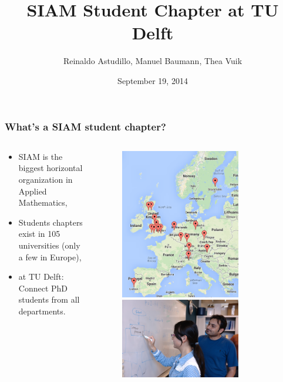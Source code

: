 \documentclass{beamer}
\title{\huge{SIAM Student Chapter at TU Delft}}
\author{Reinaldo Astudillo, Manuel Baumann, Thea Vuik}
\date{\footnotesize{September 19, 2014}}
\begin{document}
\frame{\titlepage}
\begin{frame}
\frametitle{What's a SIAM student chapter?}
\begin{columns}
 \begin{column}{0.7\textwidth}
 \begin{itemize}
  \item SIAM is the biggest horizontal organization in Applied Mathematics,
  \item Students chapters exist in 105 universities (only a few in Europe),
  \item at TU Delft: Connect PhD students from all departments.
 \end{itemize}

 \end{column}

 \begin{column}{0.4\textwidth}
  \begin{figure}[t]
  \centering
  \includegraphics[width=0.75\textwidth]{images/map} \vspace{0.6cm}\\
  \includegraphics[width=0.75\textwidth]{images/whiteboard1}
  \end{figure}
 \end{column}
 \end{columns}
\end{frame}
\end{document}
